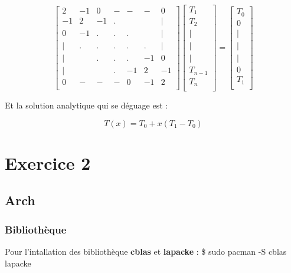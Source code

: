 \documentclass[11pt]{article}
\begin{document}
\begin{equation*}
  \left[
    \begin{array}{ccccccc}
      2 & -1 & 0 & - & - & - & 0 \\
      -1 & 2 & -1 & . &  &  & |  \\
      0 & -1 & . & . & . &  & |  \\
      | & . & . & . & . & . & |  \\
      | & & . & . & . & -1 & 0  \\
      | & & & . & -1 & 2 & -1  \\
      0 & - & - & - & 0 & -1 & 2 \\
    \end{array}
    \right]
  \left[
    \begin{array}{c}
      T_1 \\
      T_2 \\
      | \\
      | \\
      | \\
      T_{n - 1} \\
      T_n \\
    \end{array}
    \right]
  =
  \left[
  \begin{array}{c}
    T_0 \\
    0 \\
    | \\
    | \\
    | \\
    0 \\
    T_1 \\
  \end{array}
  \right]
\end{equation*}

Et la solution analytique qui se déguage est : 

$$ T(x) = T_0 + x (T_1 - T_0) $$

\section{Exercice 2}
\subsection{Arch}
\subsubsection{Bibliothèque}

Pour l'intallation des bibliothèque \textbf{cblas} et \textbf{lapacke}
:
\newline
\$ sudo pacman -S cblas lapacke
\end{document}
